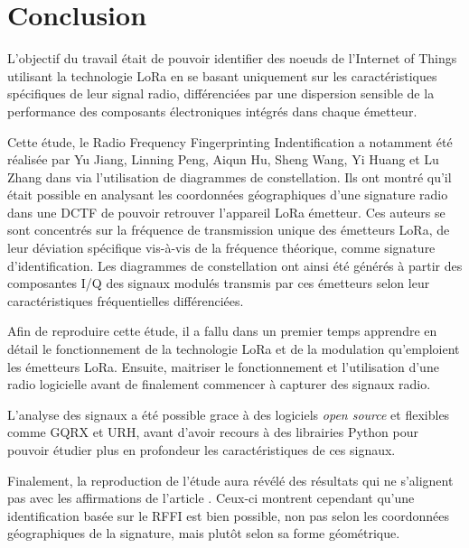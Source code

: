 \chapter*{Conclusion}
\renewcommand{\leftmark}{CONCLUSION}

L'objectif du travail était de pouvoir identifier des noeuds de l'Internet of Things utilisant la technologie \ac{LoRa} en se basant uniquement sur les caractéristiques spécifiques de leur signal radio, différenciées par une dispersion sensible de la performance des composants électroniques intégrés dans chaque émetteur.
\vspace{0.1cm}

Cette étude, le Radio Frequency Fingerprinting Indentification a notamment été réalisée par Yu Jiang, Linning Peng, Aiqun Hu, Sheng Wang, Yi Huang et Lu Zhang dans \cite{loraDCTF} via l'utilisation de diagrammes de constellation. Ils ont montré qu'il était possible en analysant les coordonnées géographiques d'une signature radio dans une \ac{DCTF} de pouvoir retrouver l'appareil \ac{LoRa} émetteur. Ces auteurs se sont concentrés sur la fréquence de transmission unique des émetteurs \ac{LoRa}, de leur déviation spécifique vis-à-vis de la fréquence théorique, comme signature d'identification. Les diagrammes de constellation ont ainsi été générés à partir des composantes \ac{I/Q} des signaux modulés transmis par ces émetteurs selon leur caractéristiques fréquentielles différenciées.

\vspace{0.1cm}

Afin de reproduire cette étude, il a fallu dans un premier temps apprendre en détail le fonctionnement de la technologie \ac{LoRa} et  de la modulation qu'emploient les émetteurs \ac{LoRa}. Ensuite, maitriser le fonctionnement et l'utilisation d'une radio logicielle avant de finalement commencer à capturer des signaux radio.

\vspace{0.1cm}

L'analyse des signaux a été possible grace à des logiciels \textit{open source} et flexibles comme GQRX et \ac{URH}, avant d'avoir recours à des librairies Python pour pouvoir étudier plus en profondeur les caractéristiques de ces signaux.

\vspace{0.1cm}

Finalement, la reproduction de l'étude aura révélé des résultats qui ne s'ali\-gnent pas avec les affirmations de l'article \cite{loraDCTF}. Ceux-ci montrent cependant qu'une identification basée sur le \ac{RFFI} est bien possible, non pas selon les coordonnées géographiques de la signature, mais plutôt selon sa forme géométrique.

